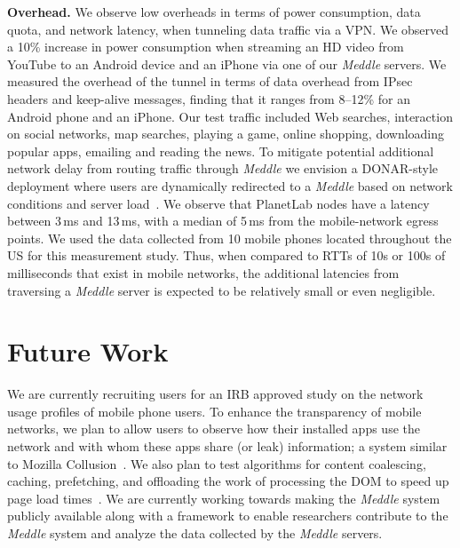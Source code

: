 \documentclass{sig-alternate}
\newcommand{\meddle}{{\em Meddle}\xspace}
\begin{document}
\textbf{Overhead.} We observe low overheads in terms of power
consumption, data quota, and network latency, when tunneling data
traffic via a VPN. We observed a 10\% increase in power consumption
when streaming an HD video from YouTube to an Android device and an
iPhone via one of our \meddle servers. We measured the overhead of the
tunnel in terms of data overhead from IPsec headers and keep-alive
messages, finding that it ranges from 8--12\% for an Android phone and
an iPhone. Our test traffic included Web searches, interaction on
social networks, map searches, playing a game, online shopping,
downloading popular apps, emailing and reading the news. To mitigate
potential additional network delay from routing traffic through
\meddle we envision a DONAR-style deployment where users are
dynamically redirected to a \meddle based on network
conditions and server load~\cite{wendell:donar}. We observe that
PlanetLab nodes have a latency between 3\,ms and 13\,ms, with a median
of 5\,ms from the mobile-network egress points. We used the data
collected from 10 mobile phones located throughout the US for this
measurement study. Thus, when compared to RTTs of 10s or 100s of
milliseconds that exist in mobile networks, the additional latencies
from traversing a \meddle server is expected to be relatively small or
even negligible.  

\section{Future Work}


We are currently recruiting users for an IRB approved study on the
network usage profiles of mobile phone users. To enhance the
transparency of mobile networks, we plan to allow users to observe how
their installed apps use the network and with whom these apps share (or
leak) information; a system similar to Mozilla
Collusion~\cite{collusion}. 
We also plan to test algorithms for content coalescing, caching,
prefetching, and offloading the work of processing the DOM to speed up
page load times~\cite{opera-mini, silk, google-spdy}. We are currently
working towards making the \meddle system publicly available along
with a framework to enable researchers contribute to the \meddle
system and analyze the data collected by the \meddle servers.  

\begin{small}


\end{small}
\end{document}
